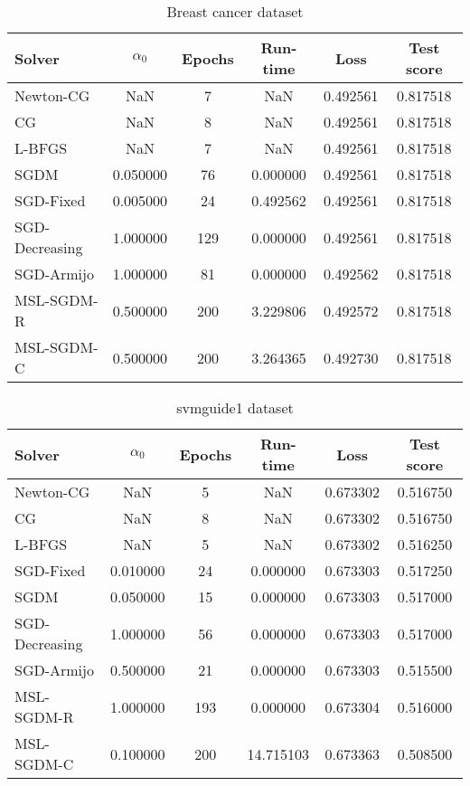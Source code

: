 \begin{table}
\centering
\caption{Breast cancer dataset}
\label{tab:breast-tab}
\begin{tabular}{lS[round-precision=3]S[drop-zero-decimal]S[round-precision=4]S[round-precision=6]S[round-precision=4]}
\toprule
Solver & {$\alpha_0$} & {Epochs} & {Run-time} & {Loss} & {Test score} \\
\midrule
Newton-CG & NaN & 7 & NaN & 0.492561 & 0.817518 \\
CG & NaN & 8 & NaN & 0.492561 & 0.817518 \\
L-BFGS & NaN & 7 & NaN & 0.492561 & 0.817518 \\
SGDM & 0.050000 & 76 & 0.000000 & 0.492561 & 0.817518 \\
SGD-Fixed & 0.005000 & 24 & 0.492562 & 0.492561 & 0.817518 \\
SGD-Decreasing & 1.000000 & 129 & 0.000000 & 0.492561 & 0.817518 \\
SGD-Armijo & 1.000000 & 81 & 0.000000 & 0.492562 & 0.817518 \\
MSL-SGDM-R & 0.500000 & 200 & 3.229806 & 0.492572 & 0.817518 \\
MSL-SGDM-C & 0.500000 & 200 & 3.264365 & 0.492730 & 0.817518 \\
\bottomrule
\end{tabular}
\end{table}

\begin{table}
\caption{svmguide1 dataset}
\label{tab:svm-tab}
\centering
\begin{tabular}{lS[round-precision=3]S[drop-zero-decimal]S[round-precision=4]S[round-precision=6]S[round-precision=4]}
\toprule
Solver & {$\alpha_0$} & {Epochs} & {Run-time} & {Loss} & {Test score} \\
\midrule
Newton-CG & NaN & 5 & NaN & 0.673302 & 0.516750 \\
CG & NaN & 8 & NaN & 0.673302 & 0.516750 \\
L-BFGS & NaN & 5 & NaN & 0.673302 & 0.516250 \\
SGD-Fixed & 0.010000 & 24 & 0.000000 & 0.673303 & 0.517250 \\
SGDM & 0.050000 & 15 & 0.000000 & 0.673303 & 0.517000 \\
SGD-Decreasing & 1.000000 & 56 & 0.000000 & 0.673303 & 0.517000 \\
SGD-Armijo & 0.500000 & 21 & 0.000000 & 0.673303 & 0.515500 \\
MSL-SGDM-R & 1.000000 & 193 & 0.000000 & 0.673304 & 0.516000 \\
MSL-SGDM-C & 0.100000 & 200 & 14.715103 & 0.673363 & 0.508500 \\
\bottomrule
\end{tabular}
\end{table}


